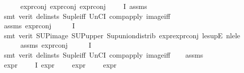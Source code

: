 \begin{isabellebody}
\ \ \ \ \isamarkupfalse%
\ expr{\isacharunderscore}{\kern0pt}{}{\isacharunderscore}{\kern0pt}conj\ expr{\isacharunderscore}{\kern0pt}{}{\isacharunderscore}{\kern0pt}conj\ expr{\isacharunderscore}{\kern0pt}{}{\isacharunderscore}{\kern0pt}conj\ {\isacartoucheopen}{\isasympsi}\ {\isasymin}\ {\isacharparenleft}{\kern0pt}{\isasymPhi}\ {\isacharbackquote}{\kern0pt}\ I{\isacharparenright}{\kern0pt}{\isacartoucheclose}\ assms\isanewline
\ \ \ \ \ \ \isamarkupfalse%
\ {\isacharparenleft}{\kern0pt}smt\ {\isacharparenleft}{\kern0pt}verit{\isacharcomma}{\kern0pt}\ del{\isacharunderscore}{\kern0pt}insts{\isacharparenright}{\kern0pt}\ Sup{\isacharunderscore}{\kern0pt}le{\isacharunderscore}{\kern0pt}iff\ UnCI\ comp{\isacharunderscore}{\kern0pt}apply\ image{\isacharunderscore}{\kern0pt}iff{\isacharparenright}{\kern0pt}\isanewline
\ \ \ \ \isamarkupfalse%
\ assms\ expr{\isacharunderscore}{\kern0pt}{}{\isacharunderscore}{\kern0pt}conj\ \ {\isacartoucheopen}{\isasympsi}\ {\isasymin}\ {\isasymPhi}\ {\isacharbackquote}{\kern0pt}\ I{\isacartoucheclose}\isanewline
\ \ \ \ \ \isamarkupfalse%
\ {\isacharparenleft}{\kern0pt}smt\ {\isacharparenleft}{\kern0pt}verit{\isacharparenright}{\kern0pt}\ SUP{\isacharunderscore}{\kern0pt}image\ SUP{\isacharunderscore}{\kern0pt}upper{}\ Sup{\isacharunderscore}{\kern0pt}union{\isacharunderscore}{\kern0pt}distrib\ expr{\isacharunderscore}{\kern0pt}{}{\isachardot}{\kern0pt}expr{\isacharunderscore}{\kern0pt}{}{\isacharunderscore}{\kern0pt}conj\ le{\isacharunderscore}{\kern0pt}supE\ nle{\isacharunderscore}{\kern0pt}le{\isacharparenright}{\kern0pt}\isanewline
\ \ \ \ \isamarkupfalse%
\ assms\ expr{\isacharunderscore}{\kern0pt}{}{\isacharunderscore}{\kern0pt}conj\ \ {\isacartoucheopen}{\isasympsi}\ {\isasymin}\ {\isasymPhi}\ {\isacharbackquote}{\kern0pt}\ I{\isacartoucheclose}\isanewline
\ \ \ \ \isamarkupfalse%
\ {\isacharparenleft}{\kern0pt}smt\ {\isacharparenleft}{\kern0pt}verit{\isacharcomma}{\kern0pt}\ del{\isacharunderscore}{\kern0pt}insts{\isacharparenright}{\kern0pt}\ Sup{\isacharunderscore}{\kern0pt}le{\isacharunderscore}{\kern0pt}iff\ UnCI\ comp{\isacharunderscore}{\kern0pt}apply\ image{\isacharunderscore}{\kern0pt}iff{\isacharparenright}{\kern0pt}\isanewline
\ \ \isamarkupfalse%
\ assms\ \isamarkupfalse%
\ expr{\isacharunderscore}{\kern0pt}{}{\isacharunderscore}{\kern0pt}{}{\isacharunderscore}{\kern0pt}{}{\isacharcolon}{\kern0pt}\ {\isachardoublequoteopen}{\isasymforall}{\isasympsi}\ {\isasymin}\ {\isasymPhi}\ {\isacharbackquote}{\kern0pt}\ I{\isachardot}{\kern0pt}\ expr{\isacharunderscore}{\kern0pt}{}\ {\isasympsi}\ {\isasymle}\ {}\ {\isasymand}\ expr{\isacharunderscore}{\kern0pt}{}\ {\isasympsi}\ {\isasymle}\ {}\ {\isasymand}\ expr{\isacharunderscore}{\kern0pt}{}\ {\isasympsi}\ {\isasymle}\ {}{\isachardoublequoteclose}\isanewline

\end{isabellebody}
